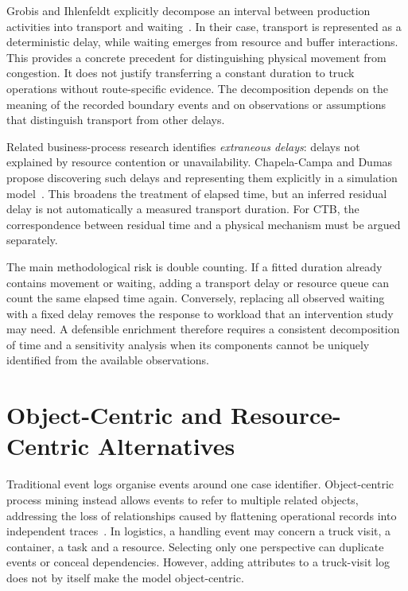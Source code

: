 Grobis and Ihlenfeldt explicitly decompose an interval between production activities into transport and waiting~\cite{Grobis2026SimulationDevelopment}. In their case, transport is represented as a deterministic delay, while waiting emerges from resource and buffer interactions. This provides a concrete precedent for distinguishing physical movement from congestion. It does not justify transferring a constant duration to truck operations without route-specific evidence. The decomposition depends on the meaning of the recorded boundary events and on observations or assumptions that distinguish transport from other delays.

Related business-process research identifies \emph{extraneous delays}: delays not explained by resource contention or unavailability. Chapela-Campa and Dumas propose discovering such delays and representing them explicitly in a simulation model~\cite{RWChapela2024Delays}. This broadens the treatment of elapsed time, but an inferred residual delay is not automatically a measured transport duration. For CTB, the correspondence between residual time and a physical mechanism must be argued separately.

The main methodological risk is double counting. If a fitted duration already contains movement or waiting, adding a transport delay or resource queue can count the same elapsed time again. Conversely, replacing all observed waiting with a fixed delay removes the response to workload that an intervention study may need. A defensible enrichment therefore requires a consistent decomposition of time and a sensitivity analysis when its components cannot be uniquely identified from the available observations.

\section{Object-Centric and Resource-Centric Alternatives}
\label{sec:rw_alternatives}

Traditional event logs organise events around one case identifier. Object-centric process mining instead allows events to refer to multiple related objects, addressing the loss of relationships caused by flattening operational records into independent traces~\cite{VanDerAalst2023OCPM}. In logistics, a handling event may concern a truck visit, a container, a task and a resource. Selecting only one perspective can duplicate events or conceal dependencies. However, adding attributes to a truck-visit log does not by itself make the model object-centric.

